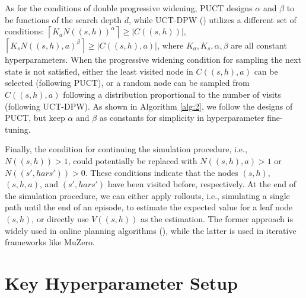 As for the conditions of double progressive widening, PUCT designs $\alpha$ and $\beta$ to be functions of the search depth $d$, while UCT-DPW (\cite{DBLP:conf/lion/CouetouxHSTB11}) utilizes a different set of conditions: $\left \lceil {K_a N((s, h))^\alpha}\right \rceil \geq |C((s, h))|$, $\left \lceil {K_s N((s, h), a)^\beta}\right \rceil \geq |C((s, h), a)|$, where $K_a, K_s, \alpha, \beta$ are all constant hyperparameters. When the progressive widening condition for sampling the next state is not satisfied, either the least visited node in \(C((s, h), a)\) can be selected (following PUCT), or a random node can be sampled from \(C((s, h), a)\) following a distribution proportional to the number of visits (following UCT-DPW). As shown in Algorithm \ref{alg:2}, we follow the designs of PUCT, but keep $\alpha$ and $\beta$ as constants for simplicity in hyperparameter fine-tuning. 

Finally, the condition for continuing the simulation procedure, i.e., $N((s, h)) > 1$, could potentially be replaced with $N((s, h), a) > 1$ or $N((s', hars')) > 0$. These conditions indicate that the nodes $(s, h)$, $(s, h, a)$, and $(s', hars')$ have been visited before, respectively. At the end of the simulation procedure, we can either apply rollouts, i.e., simulating a single path until the end of an episode, to estimate the expected value for a leaf node \((s, h)\), or directly use \(V((s, h))\) as the estimation. The former approach is widely used in online planning algorithms (\cite{DBLP:journals/jair/GuezSD13, DBLP:conf/aips/SunbergK18, DBLP:conf/aaai/LeeJKK20}), while the latter is used in iterative frameworks like MuZero.

\section{Key Hyperparameter Setup} \label{KeyPara}

